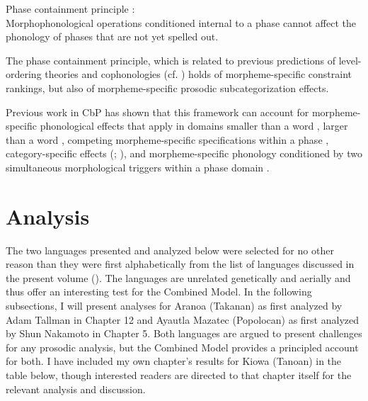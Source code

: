 \documentclass[output=paper]{langscibook}
\begin{document}
\ea
Phase containment principle\label{pcp} \citep{Sande&Jenks:2018, Sande:2020}: \\
Morphophonological operations conditioned internal to a phase cannot affect the phonology of phases that are not yet spelled out.
\z

\noindent The phase containment principle, which is related to previous predictions of level-ordering theories and cophonologies (cf. \citealt{Inkelas&Orgun:2002}) holds of morpheme-specific constraint rankings, but also of morpheme-specific prosodic subcategorization effects.

Previous work in CbP has shown that this framework can account for mor\-pheme-specific phonological effects that apply in domains smaller than a word \citep{Sande:Language}, larger than a word \citep{Sande&Jenks:2018, Sande:2020}, competing morpheme-specific specifications within a phase \citep{Sande:2020}, category-specific effects (\mbox{\citealt{Sande&Jenks:2018}}; \citealt{Sande:2020}), and morpheme-specific phonology conditioned by two simultaneous morphological triggers within a phase domain \citep{Sande:Phonology}.

\section{Analysis}

The two languages presented and analyzed below were selected for no other reason than they were first alphabetically from the list of languages discussed in the present volume (). The languages are unrelated genetically and aerially and thus offer an interesting test for the Combined Model. In the following subsections, I will present analyses for Aranoa (Takanan) as first analyzed by Adam Tallman in Chapter 12 and Ayautla Mazatec (Popolocan) as first analyzed by Shun Nakamoto in Chapter 5. Both languages are argued to present challenges for any prosodic analysis, but the Combined Model provides a principled account for both. I have included my own chapter's results for Kiowa (Tanoan) in the table below, though interested readers are directed to that chapter itself for the relevant analysis and discussion.
\end{document}
